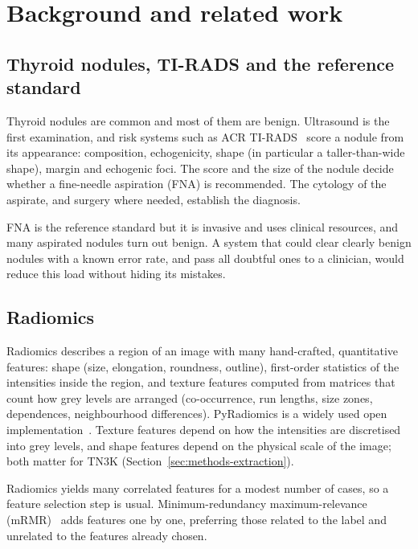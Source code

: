 \chapter{Background and related work}
\label{ch:background}

\section{Thyroid nodules, TI-RADS and the reference standard}
\label{sec:bg-thyroid}

Thyroid nodules are common and most of them are benign. Ultrasound is the first examination, and
risk systems such as ACR TI-RADS~\citep{tessler2017} score a nodule from its appearance:
composition, echogenicity, shape (in particular a taller-than-wide shape), margin and echogenic
foci. The score and the size of the nodule decide whether a fine-needle aspiration (FNA) is
recommended. The cytology of the aspirate, and surgery where needed, establish the diagnosis.

FNA is the reference standard but it is invasive and uses clinical resources, and many aspirated
nodules turn out benign. A system that could clear clearly benign nodules with a known error
rate, and pass all doubtful ones to a clinician, would reduce this load without hiding its
mistakes.

\section{Radiomics}
\label{sec:bg-radiomics}

Radiomics describes a region of an image with many hand-crafted, quantitative features: shape
(size, elongation, roundness, outline), first-order statistics of the intensities inside the
region, and texture features computed from matrices that count how grey levels are arranged
(co-occurrence, run lengths, size zones, dependences, neighbourhood differences). PyRadiomics is a
widely used open implementation~\citep{vangriethuysen2017}. Texture features depend on how the
intensities are discretised into grey levels, and shape features depend on the physical scale of
the image; both matter for TN3K (Section~\ref{sec:methods-extraction}).

Radiomics yields many correlated features for a modest number of cases, so a feature selection
step is usual. Minimum-redundancy maximum-relevance (mRMR)~\citep{peng2005} adds features one by one,
preferring those related to the label and unrelated to the features already chosen.

